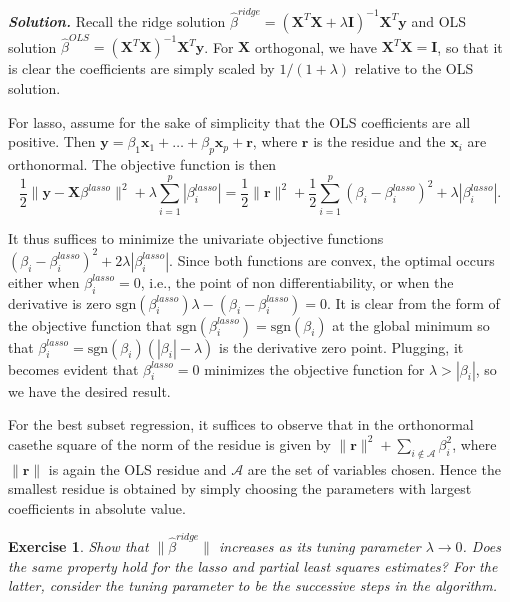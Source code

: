 \documentclass[12pt]{article}
\def\cA{\mathcal{A}}
\def\bx{\textbf{x}}
\def\bX{\textbf{X}}
\def\by{\textbf{y}}
\def\br{\textbf{r}}
\def\bI{\textbf{I}}
\newtheorem{exercise}{Exercise}[section]
\newenvironment{solution}[1][\it{Solution}]{\textbf{#1. } }{\vspace{.5cm}}
\begin{document}
\begin{solution}
	Recall the ridge solution $\hat{\beta}^{ridge} = (\bX^T \bX + \lambda \bI)^{-1}\bX^T \by$ and OLS solution $\hat{\beta}^{OLS} = (\bX^T \bX )^{-1}\bX^T \by$. For $\bX$ orthogonal, we have $\bX^T \bX = \bI$, so that it is clear the coefficients are simply scaled by $1/(1+\lambda)$ relative to the OLS solution.
	
	For lasso, assume for the sake of simplicity that the OLS coefficients are all positive. Then $\by = \beta_1 \bx_1 + \dots + \beta_p \bx_p + \br$, where $\br$ is the residue and the $\bx_i$ are orthonormal. The objective function is then 
	$$\frac{1}{2}\|\by - \bX \beta^{lasso}\|^2 + \lambda \sum_{i=1}^p |\beta_i^{lasso}| = \frac{1}{2}\|\br\|^2 + \frac{1}{2}\sum_{i=1}^p (\beta_i - \beta_i^{lasso})^2 + \lambda |\beta_i^{lasso}|.$$
	
	It thus suffices to minimize the univariate objective functions $(\beta_i - \beta_i^{lasso})^2 + 2\lambda |\beta_i^{lasso}|$. Since both functions are convex, the optimal occurs either when $\beta_i^{lasso} = 0$, i.e., the point of non differentiability, or when the derivative is zero $\text{sgn}(\beta_i^{lasso})\lambda - (\beta_i - \beta_i^{lasso}) = 0$. It is clear from the form of the objective function that $\text{sgn}(\beta_i^{lasso}) = \text{sgn}(\beta_i)$ at the global minimum so that $\beta_i^{lasso} = \text{sgn}(\beta_i)(|\beta_i| - \lambda)$ is the derivative zero point. Plugging, it becomes evident that $\beta_i^{lasso} = 0$ minimizes the objective function for $\lambda > |\beta_i|$, so we have the desired result.
	
	For the best subset regression, it suffices to observe that  in the orthonormal casethe square of the norm of the residue is given by $\|\br\|^2 + \sum_{i \notin \cA} \beta_i^2$, where $\|\br\|$ is again the OLS residue and $\cA$ are the set of variables chosen. Hence the smallest residue is obtained by simply choosing the parameters with largest coefficients in absolute value. 
\end{solution}


\begin{exercise}
Show that $\|\hat{\beta}^{ridge}\|$
 increases as its tuning parameter $\lambda \to 0$. Does the same property hold for the lasso and partial least squares estimates? For the latter, consider the tuning parameter to be the successive steps in the algorithm.	
\end{exercise}
\end{document}
